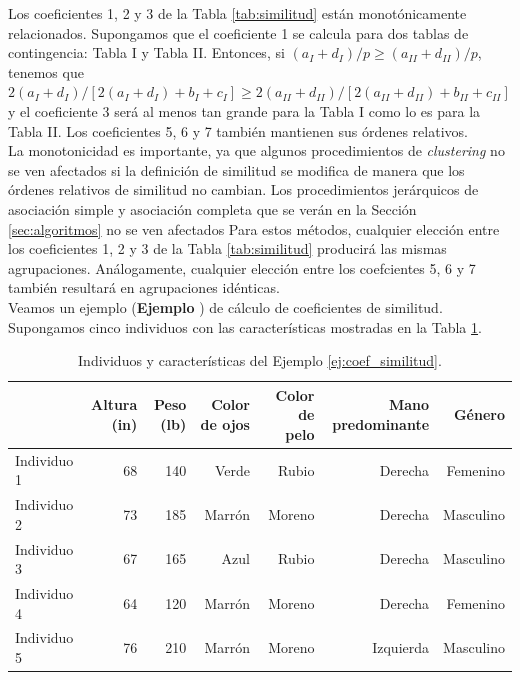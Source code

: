 \documentclass[a4paper, 20pt]{article}
\newcounter{EJCounter}
\newcommand{\ej}[1]{\refstepcounter{EJCounter}\textbf{\rmfamily Ejemplo \theEJCounter}\label{#1}}
\begin{document}
Los coeficientes 1, 2 y 3 de la Tabla \ref{tab:similitud} están monotónicamente relacionados. Supongamos que el coeficiente 1 se calcula para dos tablas de contingencia: Tabla I y Tabla II. Entonces, si $(a_I+d_I)/p \geq (a_{II}+d_{II})/p$, tenemos que $2(a_I+d_I)/[2(a_I+d_I)+b_I+c_I] \geq 2(a_{II}+d_{II})/[2(a_{II}+d_{II})+b_{II}+c_{II}]$ y el coeficiente 3 será al menos tan grande para la Tabla I como lo es para la Tabla II. Los coeficientes 5, 6 y 7 también mantienen sus órdenes relativos.\\

La monotonicidad es importante, ya que algunos procedimientos de \textit{clustering} no se ven afectados si la definición de similitud se modifica de manera que los órdenes relativos de similitud no cambian. Los procedimientos jerárquicos de asociación simple y asociación completa que se verán en la Sección \ref{sec:algoritmos} no se ven afectados Para estos métodos, cualquier elección entre los coeficientes 1, 2 y 3 de la Tabla \ref{tab:similitud} producirá las mismas agrupaciones. Análogamente, cualquier elección entre los coefcientes 5, 6 y 7 también resultará en agrupaciones idénticas.\\ %

Veamos un ejemplo (\ej{ej:coef_similitud}) de cálculo de coeficientes de similitud. Supongamos cinco individuos con las características mostradas en la Tabla \ref{tab:ej-similitud}.

\begin{table}[h]
  \centering
  \caption{Individuos y características del Ejemplo \ref{ej:coef_similitud}.}
  \label{tab:ej-similitud}
\resizebox{15cm}{!} {
  \begin{tabular}{lrrrrrr}
    \toprule
            & Altura (in) & Peso (lb) & Color de ojos & Color de pelo & Mano predominante & Género \\ \midrule
Individuo 1 & 68                       & 140                    & Verde                             & Rubio                             & Derecha                               & Femenino\\
Individuo 2 & 73 & 185 & Marrón & Moreno & Derecha & Masculino                  \\
Individuo 3 & 67 & 165 & Azul & Rubio & Derecha & Masculino                  \\
Individuo 4 & 64 & 120 & Marrón & Moreno                            & Derecha & Femenino \\
Individuo 5 & 76 & 210 & Marrón & Moreno & Izquierda & Masculino                 
\end{tabular}
}
\end{table}
\end{document}
